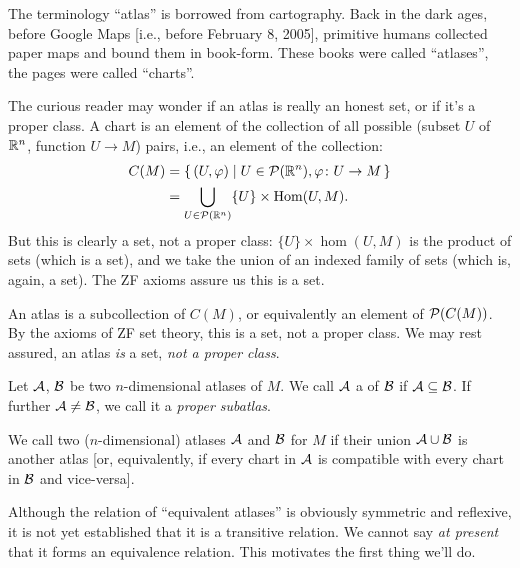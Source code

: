 \begin{remark}[Etymology]
The terminology ``atlas'' is borrowed from cartography. Back in the dark
ages, before Google Maps [i.e., before February 8, 2005], primitive humans collected paper maps and
bound them in book-form. These books were called ``atlases'', the pages
were called ``charts''.
\end{remark}

\begin{remark}\label{rmk:atlas:is-a-set}
The curious reader may wonder if an atlas is really an honest set, or if
it's a proper class. A chart is an element of the collection of all
possible (subset $U$ of $\mathbb{R}^{n}$, function $U\to M$) pairs, i.e., an
element of the collection:
\begin{equation}
\begin{split}
C(M) &= \{\,(U,\varphi)\mid U\in\mathcal{P}(\mathbb{R}^{n}),\varphi\colon U\to M\,\}\\
&=\bigcup_{U\in\mathcal{P}(\mathbb{R}^{n})}\{U\}\times\operatorname{Hom}(U,M).
\end{split}
\end{equation}
But this is clearly a set, not a proper class: $\{U\}\times\hom(U,M)$ is the
product of sets (which is a set), and we take the union of an indexed
family of sets (which is, again, a set). The ZF axioms assure us this is
a set.

An atlas is a subcollection of $C(M)$, or equivalently an element of
$\mathcal{P}(C(M))$. By the axioms of ZF
set theory, this is a set, not a proper class. We may rest assured, an
atlas \emph{is} a set, \emph{not a proper class}.
\end{remark}

\begin{definition}
Let $\mathcal{A}$, $\mathcal{B}$ be two $n$-dimensional atlases of $M$.
We call $\mathcal{A}$ a  of $\mathcal{B}$ if $\mathcal{A}\subseteq\mathcal{B}$.
If further $\mathcal{A}\neq\mathcal{B}$, we call it a \emph{proper subatlas}.
\end{definition}

\begin{definition}\label{defn:atlas:equivalence}
We call two ($n$-dimensional) atlases $\mathcal{A}$ and $\mathcal{B}$
for $M$  if their union $\mathcal{A}\cup\mathcal{B}$
is another atlas [or, equivalently, if every chart in $\mathcal{A}$ is
compatible with every chart in $\mathcal{B}$ and vice-versa].
\end{definition}

\begin{remark}
Although the relation of ``equivalent atlases'' is obviously symmetric
and reflexive, it is not yet established that it is a transitive relation.
We cannot say \emph{at present} that it forms an equivalence relation.
This motivates the first thing we'll do.
\end{remark}

